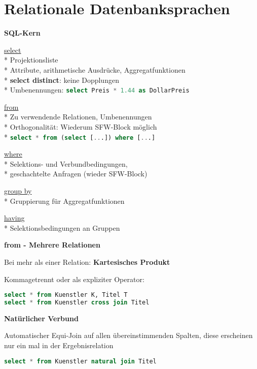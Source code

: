 \section{Relationale Datenbanksprachen}
\label{sec:sql}

\textbf{SQL-Kern}
\begin{items}
	\item \underline{select} \\*
		Projektionsliste \\*
		Attribute, arithmetische Ausdrücke, Aggregatfunktionen \\*
		\textbf{select distinct}: keine Dopplungen\\*
		Umbenennungen: \lstinline[language=sql]{select Preis * 1.44 as DollarPreis }
	\item \underline{from} \\*
		Zu verwendende Relationen, Umbenennungen\\*
		Orthogonalität: Wiederum SFW-Block möglich\\*
		\lstinline[language=sql]{select * from (select [...]) where [...] }
	\item \underline{where} \\*
		Selektions- und Verbundbedingungen, \\*
		geschachtelte Anfragen (wieder SFW-Block)
	\item \underline{group by} \\*
		Gruppierung für Aggregatfunktionen
	\item \underline{having} \\*
		Selektionsbedingungen an Gruppen
\end{items}

\textbf{from - Mehrere Relationen}
\begin{items}
	\item Bei mehr als einer Relation: \textbf{Kartesisches Produkt}
	\item Kommagetrennt oder als expliziter Operator:
	\begin{lstlisting}[language=sql]
select * from Kuenstler K, Titel T
select * from Kuenstler cross join Titel
	\end{lstlisting}
\end{items}

\textbf{Natürlicher Verbund}
\begin{items}
	\item Automatischer Equi-Join auf allen übereinstimmenden Spalten, diese erscheinen nur ein mal in der Ergebnisrelation
	\begin{lstlisting}[language=sql]
select * from Kuenstler natural join Titel
	\end{lstlisting}
\end{items}

